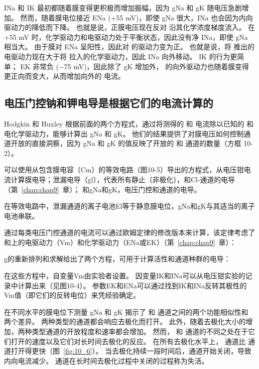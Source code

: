 INa 和 IK 最初都随着膜变得更积极而增加振幅，因为 gNa 和 gK 随电压急剧增加。
然而，随着膜电位接近 ENa (+55 mV)，即使 gNa 很大，INa 也会因为内向驱动力的降低而下降。
也就是说，正膜电压现在反对  沿其化学浓度梯度流入。
在 +55 mV 时，化学驱动力和电驱动力处于平衡状态，因此没有净 INa，即使 gNa 相当大。
由于膜对 ENa 呈阳性，因此对  的驱动力变为正。 
也就是说，将  推出的电驱动力现在大于将  拉入的化学驱动力，因此 INa 向外移动。
IK 的行为更简单； EK 非常负 (−75 mV)，因此除了 gK 增加外， 的向外驱动力也随着膜变得更正向而变大，从而增加向外的  电流。



\subsection{电压门控钠和钾电导是根据它们的电流计算的}

Hodgkin 和 Huxley 根据前面的两个方程式，通过将测得的  和  电流除以已知的  和  电化学驱动力，能够计算出 gNa 和 gK。
他们的结果提供了对膜电压如何控制通道开放的直接洞察，因为 gNa 和 gK 的值反映了开放的  和  通道的数量（方框 10-2）。


\begin{proposition}[从电压钳数据计算膜电导] \label{box:10_2}
	
	\quad \quad 可以使用从包含膜电容（Cm）的等效电路（图10-5）导出的方程式，从电压钳电流计算膜电导；泄漏电导（gl），代表所有静止（非极化），和Cl-通道的电导（第~\ref{chap:chap9}~章）；
	和gNa和gK，电压门控和通道的电导。
	
	\quad \quad 在等效电路中，泄漏通道的离子电池El等于静息膜电位，gNa和gK与其适当的离子电池串联。
	
	\quad \quad 通过每类电压门控通道的电流可以通过欧姆定律的修改版本来计算，该定律考虑了和上的电驱动力（Vm）和化学驱动力（ENa或EK）（第~\ref{chap:chap9}~章）：
	
	\quad \quad g的重新排列和求解给出了两个方程，可用于计算活性和通道种群的电导：
	
	\quad \quad 在这些方程中，自变量Vm由实验者设置。
	因变量IK和INa可以从电压钳实验的记录中计算出来（见图10-4）。
	参数EK和ENa可以通过找到IK和INa反转其极性的Vm值（即它们的反转电位）来凭经验确定。
	
\end{proposition}



在不同水平的膜电位下测量 gNa 和 gK 揭示了  和  通道之间的两个功能相似性和两个差异。
两种类型的通道都会响应去极化而打开。
此外，随着去极化大小的增加，两种类型通道的开放程度和速率都会增加。
然而， 和  通道的不同之处在于它们打开的速度以及它们对长时间去极化的反应。
在所有去极化水平上， 通道比  通道打开得更快（图~\ref{fig:10_6}）。 
当去极化持续一段时间后，通道开始关闭，导致内向电流减少。
 通道在长时间去极化过程中关闭的过程称为失活。


